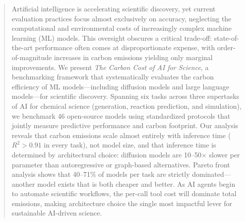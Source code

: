 \documentclass{article}
\theoremstyle{plain}
\theoremstyle{definition}
\theoremstyle{remark}
\begin{document}
\printAffiliationsAndNotice{}  %

\begin{abstract}
Artificial intelligence is accelerating scientific discovery, yet current evaluation practices focus almost exclusively on accuracy, neglecting the computational and environmental costs of increasingly complex machine learning (ML) models. This oversight obscures a critical trade-off: state-of-the-art performance often comes at disproportionate expense, with order-of-magnitude increases in carbon emissions yielding only marginal improvements. We present \textit{The Carbon Cost of AI for Science}, a benchmarking framework that systematically evaluates the carbon efficiency of ML models---including diffusion models and large language models---for scientific discovery. Spanning six tasks across three supertasks of AI for chemical science (generation, reaction prediction, and simulation), we benchmark 46 open-source models using standardized protocols that jointly measure predictive performance and carbon footprint. Our analysis reveals that carbon emissions scale almost entirely with inference time ($R^2 > 0.91$ in every task), not model size, and that inference time is determined by architectural choice: diffusion models are 10--50$\times$ slower per parameter than autoregressive or graph-based alternatives. Pareto front analysis shows that 40--71\% of models per task are strictly dominated---another model exists that is both cheaper and better. As AI agents begin to automate scientific workflows, the per-call tool cost will dominate total emissions, making architecture choice the single most impactful lever for sustainable AI-driven science.



\end{abstract}
\end{document}

